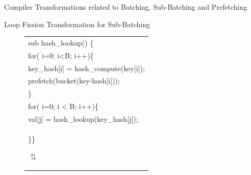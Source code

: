 \documentclass[final]{beamer}
\newlength{\sepwid}
\newlength{\onecolwid}
\newlength{\twocolwid}
\begin{document}
\begin{frame}
\begin{columns}[t]
\begin{column}{\twocolwid}
\begin{exampleblock}{Compiler Transformations related to Batching, Sub-Batching and Prefetching}
\begin{multicols}{3}
Loop Fission\cite{loop_fission} Transformation for Sub-Batching
\begin{figure}[ht]
\begin{tiny}
\begin{tabular}[b]{p{\onecolwid}}

sub\hspace{0.2\sepwid} hash\_lookup() \{\\
\hspace{0.4\sepwid}for( i=0; i<B; i++)\{\\
\hspace{0.6\sepwid}key\_hash[i] = hash\_compute(key[i]);\\
\hspace{0.6\sepwid}prefetch(bucket(key-hash[i]));\\
\hspace{0.4\sepwid}\}\\
\hspace{0.4\sepwid}for( i=0; i < B; i++)\{\\
\hspace{0.6\sepwid}val[j] = hash\_lookup(key\_hash[j]);\\
\}\hspace{0.4\sepwid}\}

\hspace{1\sepwid}$\updownarrows$\\
 

\end{tabular}
\end{tiny}
\end{figure}
\end{multicols}
\end{exampleblock}
\end{column}
\end{columns}
\end{frame}
\end{document}

